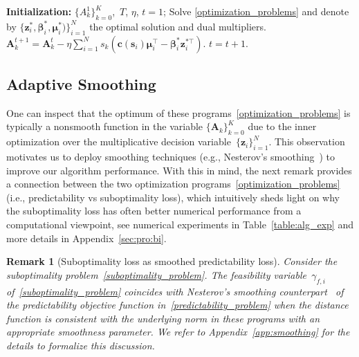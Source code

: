 \documentclass{article}
\theoremstyle{plain}
\newtheorem{remark}[theorem]{Remark}
\begin{document}
\begin{algorithm}[h!]
\caption{Gradient descent based algorithm for  \eqref{optimization_problems} using predictability loss}\label{alg:vanilla}
\begin{algorithmic}[1]
\STATE \textbf{Initialization: } $\{A^1_k\}_{k = 0}^K$,\, $T$, $\eta$, $t=1$;
\STATE Solve \eqref{optimization_problems} and denote by $\{\bm z_i^*,\bm\beta_i^*,\bm \mu_i^*)\}_{i=1}^N$ the optimal solution and dual multipliers.
\STATE  $\bm A_k^{t+1} = \bm A_k^{t} - \eta\sum_{i=1}^N s_k (\bm c(\bm s_i)\bm \mu_i^\top - \bm \beta_i^*\bm z_i^{*\top}).$
\STATE $t=t+1.$
\ENDWHILE
\end{algorithmic}
\end{algorithm}



\subsection{Adaptive Smoothing}
One can inspect that the optimum of these programs~\eqref{optimization_problems} is typically a nonsmooth function in the variable $\{\bm A_k\}_{k=0}^K$ due to the inner optimization over the multiplicative decision variable~$\{\bm z_i\}_{i=1}^N$. This observation motivates us to deploy smoothing techniques (e.g., Nesterov's smoothing~\cite{nesterov2018lectures}) to improve our algorithm performance. With this in mind, the next remark provides a connection between the two optimization programs~\eqref{optimization_problems} (i.e., predictability vs suboptimality loss), which intuitively sheds light on why the suboptimality loss has often better numerical performance from a computational viewpoint, see numerical experiments in Table~\ref{table:alg_exp} and more details in Appendix~\ref{sec:pro:bi}.



\begin{remark}[Suboptimality loss as smoothed predictability loss] \label{rem:smoothness}
Consider the suboptimality problem~\eqref{suboptimality_problem}. The feasibility variable~$\gamma_{f,i}$ of~\eqref{suboptimality_problem} coincides with Nesterov's smoothing counterpart~\cite{nesterov2005smooth} of the predictability objective function in~\eqref{predictability_problem} when the distance function is consistent with the underlying norm in these programs with an appropriate smoothness parameter. We refer to Appendix~\ref{app:smoothing} for the details to formalize this discussion.   
\end{remark}
\end{document}
